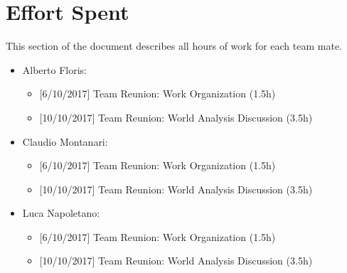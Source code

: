 \chapter{Effort Spent}

This section of the document describes all hours of work for each team mate.

\begin{itemize}

  \item Alberto Floris:
  
      \begin{itemize}
      \item {[}6/10/2017{]} Team Reunion: Work Organization (1.5h)
      \item {[}10/10/2017{]} Team Reunion: World Analysis Discussion (3.5h)
      \end{itemize}
      
   \item Claudio Montanari:
      \begin{itemize}
      \item {[}6/10/2017{]} Team Reunion: Work Organization (1.5h)
      \item {[}10/10/2017{]} Team Reunion: World Analysis Discussion (3.5h)
      \end{itemize}
      
   \item Luca Napoletano:
      \begin{itemize}
      \item {[}6/10/2017{]} Team Reunion: Work Organization (1.5h)
      \item {[}10/10/2017{]} Team Reunion: World Analysis Discussion (3.5h)
      \end{itemize}
      
      
\end{itemize}


